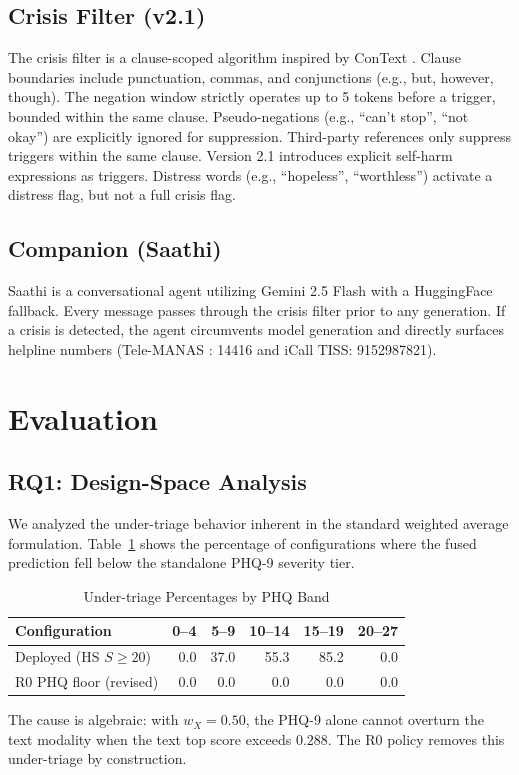 \documentclass[conference]{IEEEtran}
\begin{document}
\subsection{Crisis Filter (v2.1)}
The crisis filter is a clause-scoped algorithm inspired by ConText \cite{harkema_context}. Clause boundaries include punctuation, commas, and conjunctions (e.g., but, however, though). The negation window strictly operates up to 5 tokens before a trigger, bounded within the same clause. Pseudo-negations (e.g., ``can't stop'', ``not okay'') are explicitly ignored for suppression. Third-party references only suppress triggers within the same clause. Version 2.1 introduces explicit self-harm expressions as triggers. Distress words (e.g., ``hopeless'', ``worthless'') activate a distress flag, but not a full crisis flag.

\subsection{Companion (Saathi)}
Saathi is a conversational agent utilizing Gemini 2.5 Flash \cite{google_gemini} with a HuggingFace fallback. Every message passes through the crisis filter prior to any generation. If a crisis is detected, the agent circumvents model generation and directly surfaces helpline numbers (Tele-MANAS \cite{tele_manas}: 14416 and iCall TISS: 9152987821).

\section{Evaluation}
\label{sec:eval}

\subsection{RQ1: Design-Space Analysis}
We analyzed the under-triage behavior inherent in the standard weighted average formulation. Table~\ref{tab:under_triage} shows the percentage of configurations where the fused prediction fell below the standalone PHQ-9 severity tier.
\begin{table}[htbp]
\caption{Under-triage Percentages by PHQ Band}
\label{tab:under_triage}
\centering
\begin{tabular}{lrrrrr}
\toprule
\textbf{Configuration} & \textbf{0--4} & \textbf{5--9} & \textbf{10--14} & \textbf{15--19} & \textbf{20--27} \\
\midrule
Deployed (HS $S\geq20$) & 0.0 & 37.0 & 55.3 & 85.2 & 0.0 \\
R0 PHQ floor (revised) & 0.0 & 0.0 & 0.0 & 0.0 & 0.0 \\
\bottomrule
\end{tabular}
\end{table}
The cause is algebraic: with $w_X=0.50$, the PHQ-9 alone cannot overturn the text modality when the text top score exceeds $0.288$. The R0 policy removes this under-triage by construction.
\end{document}
